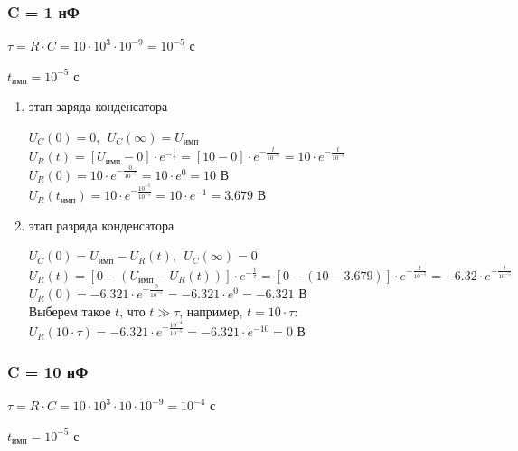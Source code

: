 \subsubsection{C = 1 нФ}

$\tau = R \cdot C = 10 \cdot 10^3 \cdot 10^{-9} = 10^{-5} \text{ с}$
		
$t_\text{имп} = 10^{-5} \text{ с}$

\begin{enumerate}
\item этап заряда конденсатора

	$U_C(0)	= 0,\ \ U_C(\infty) = U_\text{имп}$\\
	$U_R(t) = [U_\text{имп} - 0] \cdot e^{-\frac{t}{\tau}} = [10 - 0] \cdot e^{-\frac{t}{10^{-5}}} = 10 \cdot e^{-\frac{t}{10^{-5}}}$\\
	$U_R(0) = 10 \cdot e^{-\frac{0}{10^{-5}}} = 10 \cdot e^0 = 10 \text{ В}$\\
	$U_R(t_\text{имп}) = 10 \cdot e^{-\frac{10^{-5}}{10^{-5}}} = 10 \cdot e^{-1} = 3.679 \text{ В}$

\item этап разряда конденсатора

	$U_C(0)	= U_\text{имп} - U_R(t),\ \ U_C(\infty) = 0$\\
	$U_R(t) = [0 - (U_\text{имп} - U_R(t))] \cdot e^{-\frac{t}{\tau}} = [0 - (10 - 3.679)] \cdot e^{-\frac{t}{10^{-5}}} = -6.32 \cdot e^{-\frac{t}{10^{-5}}}$\\
	$U_R(0) = -6.321 \cdot e^{-\frac{0}{10^{-5}}} = -6.321 \cdot e^0 = -6.321 \text{ В}$\\
	Выберем такое $t$, что $t \gg \tau$, например, $t = 10 \cdot \tau$:\\
	$U_R(10 \cdot \tau)	= -6.321 \cdot e^{-\frac{10^{-4}}{10^{-5}}} = -6.321 \cdot e^{-10} = 0 \text{ В}$
\end{enumerate}

\subsubsection{C = 10 нФ}

$\tau = R \cdot C = 10 \cdot 10^3 \cdot 10 \cdot 10^{-9} = 10^{-4} \text{ с}$

$t_\text{имп} = 10^{-5} \text{ с}$

